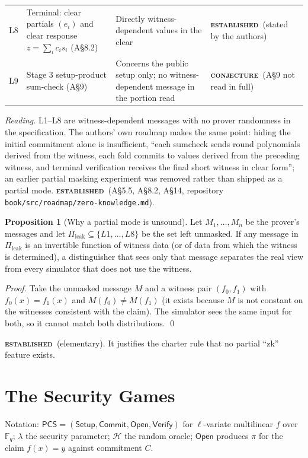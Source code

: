 \documentclass[11pt]{article}
\newcommand{\epitag}[3]{\colorbox{#2}{\textcolor{#1}{\textsc{\footnotesize\bfseries #3}}}}
\newcommand{\established}{\epitag{estgreen}{estbg}{established}}
\newcommand{\conjectureTag}{\epitag{conjyellow}{conjbg}{conjecture}}
\renewcommand{\_}{\textunderscore\allowbreak{}}
\newcommand{\code}[1]{\texttt{\small #1}}
\theoremstyle{definition}
\newtheorem{proposition}[definition]{Proposition}
\begin{document}
\begin{center}
\begin{longtable}{@{}p{}p{}p{}p{}@{}}
L8 & Terminal: clear partials $(e_i)$ and clear response $z=\sum_i c_is_i$ (A\S8.2) & Directly witness-dependent values in the clear & \established\ (stated by the authors)\\
L9 & Stage 3 setup-product sum-check (A\S9) & Concerns the public setup only; no witness-dependent message in the portion read & \conjectureTag\ (A\S9 not read in full)\\
\bottomrule
\end{longtable}
\end{center}
\textit{Reading.} L1--L8 are witness-dependent messages with no prover randomness in the specification. The authors' own roadmap makes the same point: hiding the initial commitment alone is insufficient, ``each sumcheck sends round polynomials derived from the witness, each fold commits to values derived from the preceding witness, and terminal verification receives the final short witness in clear form''; an earlier partial masking experiment was removed rather than shipped as a partial mode.
\established\ (A\S5.5, A\S8.2, A\S14, repository \code{book/src/roadmap/zero-knowledge.md}).

\begin{proposition}[Why a partial mode is unsound]
\label{prop:partial}
Let $M_1,\dots,M_n$ be the prover's messages and let $\Pi_{\mathrm{leak}}\subseteq\{L1,\dots,L8\}$ be the set left unmasked. If any message in $\Pi_{\mathrm{leak}}$ is an invertible function of witness data (or of data from which the witness is determined), a distinguisher that sees only that message separates the real view from every simulator that does not use the witness.
\end{proposition}
\begin{proof}
Take the unmasked message $M$ and a witness pair $(f_0,f_1)$ with $f_0(x)=f_1(x)$ and $M(f_0)\ne M(f_1)$ (it exists because $M$ is not constant on the witnesses consistent with the claim). The simulator sees the same input for both, so it cannot match both distributions. \qed
\end{proof}
\established\ (elementary). It justifies the charter rule that no partial ``zk'' feature exists.

\section{The Security Games}
\label{sec:games}
Notation: $\mathsf{PCS}=(\mathsf{Setup},\mathsf{Commit},\mathsf{Open},\mathsf{Verify})$ for $\ell$-variate multilinear $f$ over $\mathbb{F}_q$; $\lambda$ the security parameter; $\mathcal{H}$ the random oracle; $\mathsf{Open}$ produces $\pi$ for the claim $f(x)=y$ against commitment $C$.
\end{document}
